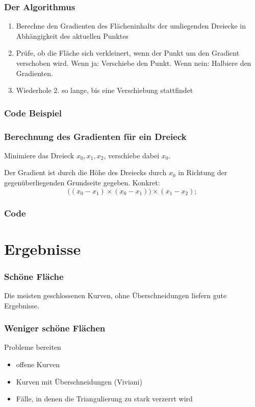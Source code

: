 \documentclass{beamer}
\begin{document}
\begin{frame}
	\frametitle{Der Algorithmus}
	\begin{enumerate}[1.]
		\item
			Berechne den Gradienten des Flächeninhalts der umliegenden Dreiecke in Abhängigkeit des aktuellen Punktes
		\item
			Prüfe, ob die Fläche sich verkleinert, wenn der Punkt um den Gradient verschoben wird.
			Wenn ja: Verschiebe den Punkt.
			Wenn nein: Halbiere den Gradienten.
		\item
			Wiederhole 2. so lange, bis eine Verschiebung stattfindet
	\end{enumerate}
\end{frame}

\begin{frame}
	\frametitle{Code Beispiel}
	
\end{frame}

\begin{frame}
	\frametitle{Berechnung des Gradienten für ein Dreieck}
	Minimiere das Dreieck $x_0,x_1,x_2$, verschiebe dabei $x_0$.

	Der Gradient ist durch die Höhe des Dreiecks durch $x_0$ in Richtung der gegenüberliegenden Grundseite gegeben.
	Konkret:
	\[
		\big((x_0 - x_1) \times (x_0 - x_1)\big) \times (x_1 - x_2);
	\]
\end{frame}

\begin{frame}
	\frametitle{Code}
	
\end{frame}


\section{Ergebnisse}

\begin{frame}
	\frametitle{Schöne Fläche}
	Die meisten geschlossenen Kurven, ohne Überschneidungen liefern gute Ergebnisse.
\end{frame}

\begin{frame}
	\frametitle{Weniger schöne Flächen}
	Probleme bereiten
	\begin{itemize}
		\item
			offene Kurven 
		\item
			Kurven mit Überschneidungen (Viviani)
		\item
			Fälle, in denen die Triangulierung zu stark verzerrt wird
	\end{itemize}
\end{frame}
\end{document}
